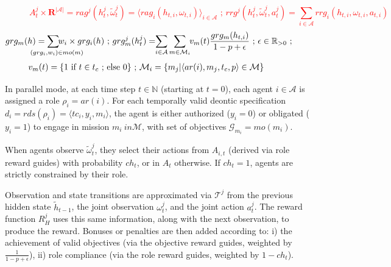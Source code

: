 \begin{figure}[h!]
\begin{scriptsize}
%
\vspace{-0.3cm}
\textcolor{red}{\[A^j_t \times \mathbf{R}^{|\mathcal{A}|} = rag^j(h^j_t, \tilde{\omega}^j_t) = \langle rag_i(h_{t,i}, \omega_{t,i}) \rangle_{i \in \mathcal{A}} \text{ ; } rrg^j(h^j_t, \tilde{\omega}^j_t, a^j_t) = \sum_{i \in \mathcal{A}}{rrg_i(h_{t,i}, \omega_{t,i}, a_{t,i})}\]}
%
\vspace{-0.75cm}
\textcolor{blue}{
  \begin{gather*}
    \hspace{-1cm} grg_m(h) = \hspace{-1cm} \sum_{\hspace{0.3cm}(grg_i,w_i) \in mo(m)} {\hspace{-1.1cm} w_i \times grg_i(h)}
    \text{ ; }
    grg^j_m(h^j_t) = \hspace{-0.1cm} \sum_{i \in \mathcal{A}}{\sum_{m \in \mathcal{M}_i}{ \hspace{-0.1cm} v_m(t) \frac{grg_m(h_{t,i})}{1 - p + \epsilon} }} \text{ ; } \epsilon \in \mathbb{R}_{>0} \text{ ; }
  \end{gather*}
}
\vspace{-0.9cm}
\textcolor{blue}{
  \begin{gather*}
    \hspace{-1cm}
    v_m(t) = \{ 1 \text{ if } t \in t_c \text{ ; else } 0 \} \text{ ; } \mathcal{M}_i = \{m_j | \langle ar(i),m_j,t_c,p \rangle \in \mathcal{M}\}
  \end{gather*}
}
\end {scriptsize}

\end{figure}

\noindent In parallel mode, at each time step $t \in \mathbb{N}$ (starting at $t=0$), each agent $i \in \mathcal{A}$ is assigned a role $\rho_i = ar (i)$. For each temporally valid deontic specification $d_i = rds(\rho_i) = \langle tc_i, y_i, m_i \rangle$, the agent is either authorized ($y_i = 0$) or obligated ($y_i = 1$) to engage in mission $m_i \ in \mathcal{M}$, with set of objectives $\mathcal{G}_{m_i} = mo(m_i)$.

When agents observe $\tilde{\omega}_t^j$, they select their actions from $A_{i,t}$ (derived via role reward guides) with probability $ch_t$, or in $A_t$ otherwise. If $ch_t = 1$, agents are strictly constrained by their role.

Observation and state transitions are approximated via  $\mathcal{T}^j$ from the previous hidden state $\tilde{h}_{t-1}$, the joint observation $\omega^j_t$, and the joint action $a^j_t$. The reward function $R^j_H$ uses this same information, along with the next observation, to produce the reward. Bonuses or penalties are then added according to:
i) the achievement of valid objectives (via the objective reward guides, weighted by $\frac{1}{1 - p + \epsilon}$),
ii) role compliance (via the role reward guides, weighted by $1 - ch_t$).

